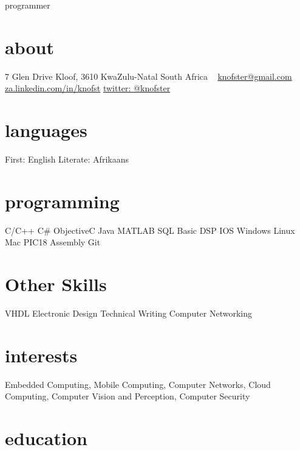 \documentclass[]{friggeri-cv}
\begin{document}
       {programmer}


\begin{aside}
  \section{about}
    7 Glen Drive
    Kloof, 3610
    KwaZulu-Natal
    South Africa 
    ~
    \href{mailto:knofster@gmail.com}{knofster@gmail.com}
    \href{http://za.linkedin.com/in/knofst}{za.linkedin.com/in/knofst}
    \href{https://twitter.com/knofster}{twitter: @knofster}
  \section{languages}
    First: English
    Literate: Afrikaans
  \section{programming}
    C/C++
    C\#
    ObjectiveC
    Java
    MATLAB
    SQL
   	Basic DSP
   	IOS
   	Windows
   	Linux
   	Mac
   	PIC18 Assembly
   	Git
  \section{Other Skills}
  	VHDL
  	Electronic Design
  	Technical Writing
  	Computer Networking
    
\end{aside}

\section{interests}

Embedded Computing, Mobile Computing, Computer Networks, Cloud Computing, Computer Vision and Perception, Computer Security 

\section{education}
\end{document}

